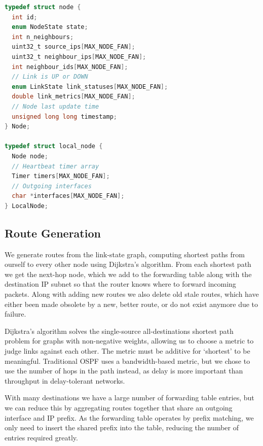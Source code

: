 \documentclass[withindex,glossary,openany]{cam-thesis}
\begin{document}
\begin{minipage}{1\textwidth} \centering
\begin{lstlisting}[language=C, label=node_data_structs, frame=tb, columns=fullflexible, caption=C source code for \texttt{Node} and \texttt{LocalNode} data structures]
typedef struct node {
  int id;
  enum NodeState state;
  int n_neighbours;
  uint32_t source_ips[MAX_NODE_FAN];
  uint32_t neighbour_ips[MAX_NODE_FAN];
  int neighbour_ids[MAX_NODE_FAN];
  // Link is UP or DOWN
  enum LinkState link_statuses[MAX_NODE_FAN];
  double link_metrics[MAX_NODE_FAN];
  // Node last update time
  unsigned long long timestamp;
} Node;

typedef struct local_node {
  Node node;
  // Heartbeat timer array
  Timer timers[MAX_NODE_FAN];
  // Outgoing interfaces
  char *interfaces[MAX_NODE_FAN];
} LocalNode;
\end{lstlisting}
\end{minipage}

\subsection{Route Generation}

We generate routes from the link-state graph, computing shortest paths from ourself to every other node using Dijkstra's algorithm. From each shortest path we get the next-hop node, which we add to the forwarding table along with the destination IP subnet so that the router knows where to forward incoming packets. Along with adding new routes we also delete old stale routes, which have either been made obsolete by a new, better route, or do not exist anymore due to failure.

Dijkstra's algorithm solves the single-source all-destinations shortest path problem for graphs with non-negative weights, allowing us to choose a metric to judge links against each other. The metric must be additive for `shortest' to be meaningful. Traditional OSPF uses a bandwidth-based metric, but we chose to use the number of hops in the path instead, as delay is more important than throughput in delay-tolerant networks.

With many destinations we have a large number of forwarding table entries, but we can reduce this by aggregating routes together that share an outgoing interface and IP prefix. As the forwarding table operates by prefix matching, we only need to insert the shared prefix into the table, reducing the number of entries required greatly.
\end{document}
